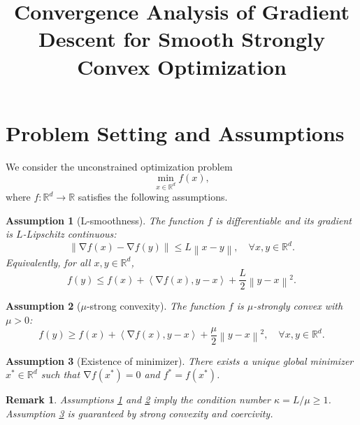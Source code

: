 \documentclass[11pt]{article}
\newtheorem{assumption}{Assumption}
\newtheorem{remark}{Remark}
\DeclareMathOperator{\grad}{\nabla}
\newcommand{\norm}[1]{\left\|#1\right\|}
\newcommand{\inner}[2]{\left\langle #1, #2 \right\rangle}
\newcommand{\R}{\mathbb{R}}
\begin{document}
\title{Convergence Analysis of Gradient Descent for Smooth Strongly Convex Optimization}
\author{}
\date{}
\maketitle

\section{Problem Setting and Assumptions}

We consider the unconstrained optimization problem
\begin{equation}
    \min_{x \in \R^d} f(x),
    \label{eq:problem}
\end{equation}
where $f: \R^d \to \R$ satisfies the following assumptions.

\begin{assumption}[L-smoothness] \label{assump:smooth}
    The function $f$ is differentiable and its gradient is $L$-Lipschitz continuous:
    \begin{equation}
        \norm{\grad f(x) - \grad f(y)} \le L \norm{x - y}, \quad \forall x, y \in \R^d.
    \end{equation}
    Equivalently, for all $x, y \in \R^d$,
    \begin{equation}
        f(y) \le f(x) + \inner{\grad f(x)}{y - x} + \frac{L}{2} \norm{y - x}^2.
        \label{eq:smoothness}
    \end{equation}
\end{assumption}

\begin{assumption}[$\mu$-strong convexity] \label{assump:strong_convex}
    The function $f$ is $\mu$-strongly convex with $\mu > 0$:
    \begin{equation}
        f(y) \ge f(x) + \inner{\grad f(x)}{y - x} + \frac{\mu}{2} \norm{y - x}^2, \quad \forall x, y \in \R^d.
        \label{eq:strong_convexity}
    \end{equation}
\end{assumption}

\begin{assumption}[Existence of minimizer] \label{assump:minimizer}
    There exists a unique global minimizer $x^* \in \R^d$ such that $\grad f(x^*) = 0$ and $f^* = f(x^*)$.
\end{assumption}

\begin{remark}
    Assumptions \ref{assump:smooth} and \ref{assump:strong_convex} imply the condition number $\kappa = L/\mu \ge 1$. Assumption \ref{assump:minimizer} is guaranteed by strong convexity and coercivity.
\end{remark}
\end{document}
